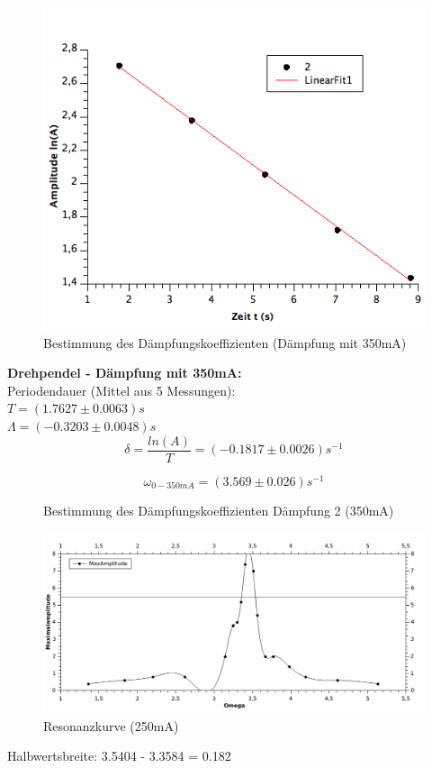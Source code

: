 \documentclass[12pt,a4paper]{article}
\begin{document}
\begin{multicols}{2}
\begin{figure}[H]
	\centering
	\includegraphics[scale=0.3]{./figure/Messung1_Daempfung_omega0-350mA.png}
	\caption{Bestimmung des Dämpfungskoeffizienten (Dämpfung mit 350mA)}
	\label{fig:daempfung_omega0_350mA}
\end{figure}

\noindent \textbf{Drehpendel - Dämpfung mit 350mA:}\\
Periodendauer (Mittel aus 5 Messungen):\\
$T = (1.7627 \pm 0.0063)s$\\
$\Lambda = (-0.3203 \pm 0.0048)s$
$$\delta = \frac{ln(A)}{T} = (-0.1817 \pm 0.0026)s^{-1}$$

$$\omega_{0 - 350mA}=(3.569 \pm 0.026)s^{-1}$$

\begin{figure}[H]
	\centering
	\caption{Bestimmung des Dämpfungskoeffizienten Dämpfung 2 (350mA)}
	\label{fig:daempfung_omega0_2}
\end{figure}

\end{multicols}

\begin{figure}[H]
	\centering
	\includegraphics[scale=1.5]{./figure/Messung1_Resonanzkurve_250mA.png}
	\caption{Resonanzkurve (250mA)}
	\label{fig:resonanzkurve_250mA}
\end{figure}
Halbwertsbreite: 3.5404 - 3.3584 = 0.182 
\end{document}
